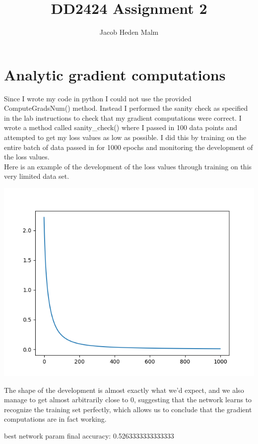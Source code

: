\documentclass[11pt,a4paper]{article}
\author{Jacob Heden Malm}
\title{DD2424 Assignment 2}
\begin{document}
\maketitle

\section{Analytic gradient computations}
Since I wrote my code in python I could not use the provided ComputeGradsNum() method. Instead I performed the sanity check as specified in the lab instructions to check that my gradient computations were correct. I wrote a method called sanity\_check() where I passed in 100 data points and attempted to get my loss values as low as possible. I did this by training on the entire batch of data passed in for 1000 epochs and monitoring the development of the loss values.\\

Here is an example of the development of the loss values through training on this very limited data set.

\includegraphics[width=\textwidth]{sanity_check.png}

The shape of the development is almost exactly what we'd expect, and we also manage to get almost arbitrarily close to 0, suggesting that the network learns to recognize the training set perfectly, which allows us to conclude that the gradient computations are in fact working.


best network param final accuracy: 0.5263333333333333
\end{document}
